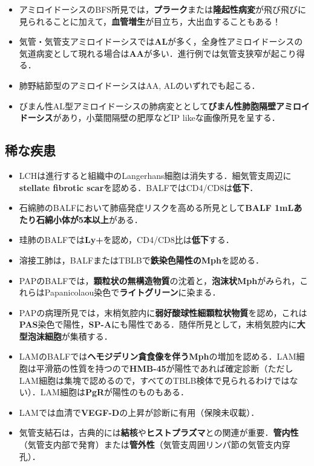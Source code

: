 \begin{itemize}

\item アミロイドーシスのBFS所見では，\textbf{プラーク}または\textbf{隆起性病変}が飛び飛びに見られることに加えて，\textbf{血管増生}が目立ち，大出血することもある！
\item 気管・気管支アミロイドーシスでは\textbf{AL}が多く，全身性アミロイドーシスの気道病変として現れる場合は\textbf{AA}が多い．進行例では気管支狭窄が起こり得る．
\item 肺野結節型のアミロイドーシスはAA, ALのいずれでも起こる．
\item びまん性AL型アミロイドーシスの肺病変ととして\textbf{びまん性肺胞隔壁アミロイドーシス}があり，小葉間隔壁の肥厚などIP likeな画像所見を呈する．
\end{itemize}

\subsection{稀な疾患}

\begin{itemize}
\item LCHは進行すると組織中のLangerhans細胞は消失する．細気管支周辺に\textbf{stellate fibrotic scar}を認める．BALFではCD4/CD8は\textbf{低下}．



\item 石綿肺のBALFにおいて肺癌発症リスクを高める所見として\textbf{BALF 1mLあたり石綿小体が5本以上}がある．
\item 珪肺のBALFでは\textbf{Ly+}を認め，CD4/CD8比は\textbf{低下}する．
\item 溶接工肺は，BALFまたはTBLBで\textbf{鉄染色陽性のMph}を認める．

\item PAPのBALFでは，\textbf{顆粒状の無構造物質}の沈着と，\textbf{泡沫状Mph}がみられ，これらはPapanicolaou染色で\textbf{ライトグリーン}に染まる．
\item PAPの病理所見では，末梢気腔内に\textbf{弱好酸球性細顆粒状物質}を認め，これは\textbf{PAS}染色で陽性，\textbf{SP-A}にも陽性である．随伴所見として，末梢気腔内に\textbf{大型泡沫細胞}が集積する．

\item LAMのBALFでは\textbf{ヘモジデリン貪食像を伴うMph}の増加を認める．LAM細胞は平滑筋の性質を持つので\textbf{HMB-45}が陽性であれば確定診断（ただしLAM細胞は集塊で認めるので，すべてのTBLB検体で見られるわけではない）．LAM細胞は\textbf{PgR}が陽性のものもある．
\item LAMでは血清で\textbf{VEGF-D}の上昇が診断に有用（保険未収載）．

\item 気管支結石は，古典的には\textbf{結核}や\textbf{ヒストプラズマ}との関連が重要．\textbf{管内性}（気管支内部で発育）または\textbf{管外性}（気管支周囲リンパ節の気管支内穿孔）．
\end{itemize}



